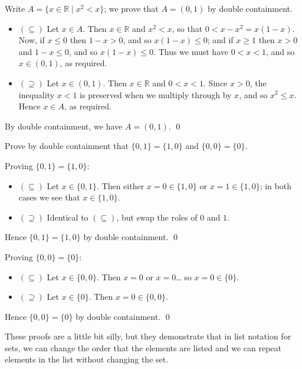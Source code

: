 \begin{solutions*}
Write $A = \{ x \in \mathbb{R} \mid x^2 < x \}$; we prove that $A = (0,1)$ by double containment.
\begin{itemize}
\item $(\subseteq)$ Let $x \in A$. Then $x \in \mathbb{R}$ and $x^2 < x$, so that $0 < x-x^2 = x(1-x)$. Now, if $x \le 0$ then $1-x > 0$, and so $x(1-x) \le 0$; and if $x \ge 1$ then $x > 0$ and $1-x \le 0$, and so $x(1-x) \le 0$. Thus we must have $0<x<1$, and so $x \in (0,1)$, as required.
\item $(\supseteq)$ Let $x \in (0,1)$. Then $x \in \mathbb{R}$ and $0<x<1$. Since $x>0$, the inequality $x<1$ is preserved when we multiply through by $x$, and so $x^2 \le x$. Hence $x \in A$, as required.
\end{itemize}
By double containment, we have $A = (0,1)$. \qed
\end{solutions*}

\begin{exercise}
Prove by double containment that $\{ 0, 1 \} = \{ 1, 0 \}$ and $\{ 0, 0 \} = \{ 0 \}$.
\end{exercise}

\begin{solutions*}
Proving $\{ 0, 1 \} = \{ 1, 0 \}$:
\begin{itemize}
\item $(\subseteq)$ Let $x \in \{ 0, 1 \}$. Then either $x = 0 \in \{ 1, 0 \}$ or $x = 1 \in \{ 1, 0 \}$; in both cases we see that $x \in \{ 1, 0 \}$.
\item $(\supseteq)$ Identical to $(\subseteq)$, but swap the roles of $0$ and $1$.
\end{itemize}
Hence $\{ 0, 1 \} = \{ 1, 0 \}$ by double containment. \qed

Proving $\{ 0, 0 \} = \{ 0 \}$:
\begin{itemize}
\item $(\subseteq)$ Let $x \in \{ 0, 0 \}$. Then $x = 0$ or $x = 0$\dots{} so $x = 0 \in \{ 0 \}$.
\item $(\supseteq)$ Let $x \in \{ 0 \}$. Then $x = 0 \in \{ 0, 0 \}$.
\end{itemize}
Hence $\{ 0, 0 \} = \{ 0 \}$ by double containment. \qed

These proofs are a little bit silly, but they demonstrate that in list notation for sets, we can change the order that the elements are listed and we can repeat elements in the list without changing the set.
\end{solutions*}


